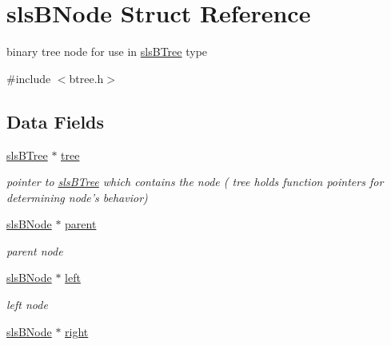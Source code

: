 \hypertarget{structsls_b_node}{\section{sls\+B\+Node Struct Reference}
\label{structsls_b_node}
}


binary tree node for use in \hyperlink{structsls_b_tree}{sls\+B\+Tree} type  




{\ttfamily \#include $<$btree.\+h$>$}

\subsection*{Data Fields}
\begin{DoxyCompactItemize}
\item 
\hypertarget{structsls_b_node_a0524705972875ad5efb949978895b288}{\hyperlink{structsls_b_tree}{sls\+B\+Tree} $\ast$ \hyperlink{structsls_b_node_a0524705972875ad5efb949978895b288}{tree}}\label{structsls_b_node_a0524705972875ad5efb949978895b288}

\begin{DoxyCompactList}\small\item\em pointer to \hyperlink{structsls_b_tree}{sls\+B\+Tree} which contains the node ( tree holds function pointers for determining node's behavior) \end{DoxyCompactList}\item 
\hypertarget{structsls_b_node_ab439d78c3bfe56075fdebd149fdbf96a}{\hyperlink{structsls_b_node}{sls\+B\+Node} $\ast$ \hyperlink{structsls_b_node_ab439d78c3bfe56075fdebd149fdbf96a}{parent}}\label{structsls_b_node_ab439d78c3bfe56075fdebd149fdbf96a}

\begin{DoxyCompactList}\small\item\em parent node \end{DoxyCompactList}\item 
\hypertarget{structsls_b_node_a0bedf923c7105f55f45b458efaf10e7e}{\hyperlink{structsls_b_node}{sls\+B\+Node} $\ast$ \hyperlink{structsls_b_node_a0bedf923c7105f55f45b458efaf10e7e}{left}}\label{structsls_b_node_a0bedf923c7105f55f45b458efaf10e7e}

\begin{DoxyCompactList}\small\item\em left node \end{DoxyCompactList}\item 
\hypertarget{structsls_b_node_a38be214870a97c1900ba1b4d004690b0}{\hyperlink{structsls_b_node}{sls\+B\+Node} $\ast$ \hyperlink{structsls_b_node_a38be214870a97c1900ba1b4d004690b0}{right}}\label{structsls_b_node_a38be214870a97c1900ba1b4d004690b0}


\end{DoxyCompactItemize}
